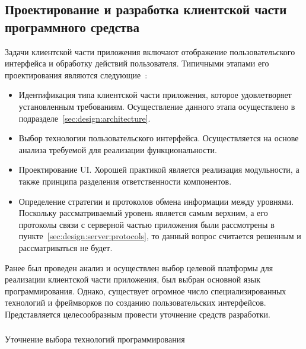 \subsection{Проектирование и разработка клиентской части программного средства}
\label{sec:design:client}

Задачи клиентской части приложения включают отображение пользовательского интерфейса и обработку действий пользователя. Типичными этапами его проектирования являются следующие~\cite[с.~78]{application_architecture_guide}:

\begin{itemize}
	\item Идентификация типа клиентской части приложения, которое удовлетворяет установленным требованиям. Осуществление данного этапа осуществлено в подразделе~\ref{sec:design:architecture}.
	\item Выбор технологии пользовательского интерфейса. Осуществляется на основе анализа требуемой для реализации функциональности.
	\item Проектирование UI. Хорошей практикой является реализация модульности, а также принципа разделения ответственности компонентов.
	\item Определение стратегии и протоколов обмена информации между уровнями. Поскольку рассматриваемый уровень является самым верхним, а его протоколы связи с серверной частью приложения были рассмотрены в пункте~\ref{sec:design:server:protocols}, то данный вопрос считается решенным и рассматриваться не будет.
\end{itemize}

Ранее был проведен анализ и осуществлен выбор целевой платформы для реализации клиентской части приложения, был выбран основной язык программирования. Однако, существует огромное число специализированных технологий и фреймворков по созданию пользовательских интерфейсов. Представляется целесообразным провести уточнение средств разработки.

\subsubsection{} Уточнение выбора технологий программирования
\label{sec:design:client:technologies}

